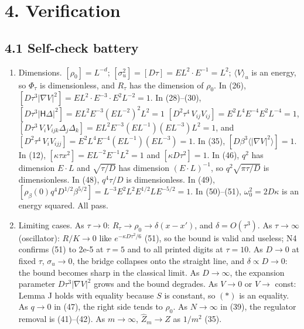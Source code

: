 \documentclass[11pt,a4paper]{article}
\begin{document}
\hypertarget{verification}{%
\section{4. Verification}\label{verification}}

\hypertarget{self-check-battery}{%
\subsection{4.1 Self-check battery}\label{self-check-battery}}

\begin{enumerate}
\def\labelenumi{\arabic{enumi}.}
\item
  Dimensions. \([\rho_0]=L^{-d}\); \([\sigma_u^2]=[D\tau]=EL^2\cdot E^{-1}=L^2\); \(\langle V\rangle_u\) is an energy, so \(\Phi_\tau\) is dimensionless, and \(R_\tau\) has the dimension of \(\rho_0\). In (26), \([D\tau^3|\nabla V|^2]=EL^2\cdot E^{-3}\cdot E^2L^{-2}=1\). In (28)--(30), \([D\tau^3|\mathsf H\Delta|^2]=EL^2E^{-3}(EL^{-2})^2L^2=1\) \([D^2\tau^4\,V_{ij}V_{ij}]=E^2L^4E^{-4}E^2L^{-4}=1\), \([D\tau^3\,V_iV_{ijk}\Delta_j\Delta_k]=EL^2E^{-3}(EL^{-1})(EL^{-3})L^2=1\), and \([D^2\tau^4\,V_iV_{ijj}]=E^2L^4E^{-4}(EL^{-1})(EL^{-3})=1\). In (35), \([D\beta^3\langle|\nabla V|^2\rangle]=1\). In (12), \([\kappa\tau x^2]=EL^{-2}E^{-1}L^2=1\) and \([\kappa D\tau^2]=1\). In (46), \(q^2\) has dimension \(E\cdot L\) and \(\sqrt{\tau/D}\) has dimension \((E\cdot L)^{-1}\), so \(q^2\sqrt{\pi\tau/D}\) is dimensionless. In (48), \(q^4\tau/D\) is dimensionless. In (49), \([\rho_\beta(0)q^4D^{1/2}\beta^{5/2}]=L^{-3}E^2L^2E^{1/2}LE^{-5/2}=1\). In (50)--(51), \(\omega_0^2=2D\kappa\) is an energy squared. All pass.
\item
  Limiting cases. As \(\tau\to0\): \(R_\tau\to\rho_0\to\delta(x-x')\), and \(\delta=O(\tau^3)\). As \(\tau\to\infty\) (oscillator): \(R/K\to0\) like \(e^{-\kappa D\tau^2/6}\) (51), so the bound is valid and useless; N4 confirms (51) to 2e-5 at \(\tau=5\) and to all printed digits at \(\tau=10\). As \(D\to0\) at fixed \(\tau\), \(\sigma_u\to0\), the bridge collapses onto the straight line, and \(\delta\propto D\to0\): the bound becomes sharp in the classical limit. As \(D\to\infty\), the expansion parameter \(D\tau^3|\nabla V|^2\) grows and the bound degrades. As \(V\to0\) or \(V\to\) const: Lemma J holds with equality because \(S\) is constant, so \((\ast)\) is an equality. As \(q\to0\) in (47), the right side tends to \(\rho_0\). As \(N\to\infty\) in (39), the regulator removal is (41)--(42). As \(m\to\infty\), \(\hat Z_m\to Z\) as \(1/m^2\) (35).

\end{enumerate}
\end{document}
